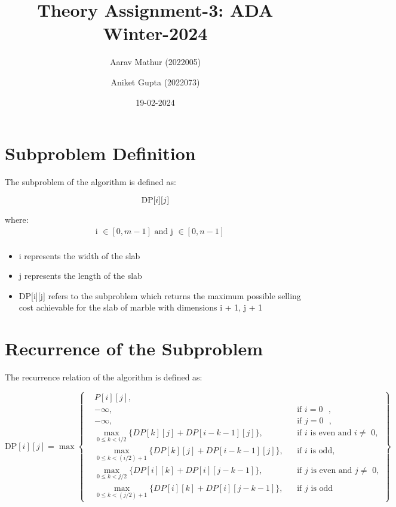 \documentclass{article}
\title{Theory Assignment-3: ADA Winter-2024}
\author{Aarav Mathur (2022005) \and Aniket Gupta (2022073)}
\date{19-02-2024}
\begin{document}
\maketitle

\section{Subproblem Definition}

The subproblem of the algorithm is defined as:

\[
\text{{DP}}\text[i][j]
\]

where:
\begin{align*}
& \text{ i $\in [0,m-1]$ and j $\in [0,n-1]$}  \\
\end{align*}

\begin{itemize}
    \item i represents the width of the slab
    \item j represents the length of the slab
    \item DP[i][j] refers to the subproblem which returns the maximum possible selling cost achievable for the slab of marble with dimensions i + 1, j + 1
\end{itemize}

\section{Recurrence of the Subproblem}

The recurrence relation of the algorithm is defined as:

\[
\text{DP}[i][j] = \max \left\{
\begin{aligned}
&P[i][j], \\
&-{\infty}, && \text{if } i = 0 \text{ }, \\
&-{\infty}, && \text{if } j = 0 \text{ }, \\
&\max_{0 \leq k < i/2} \{DP[k][j] + DP[i-k-1][j]\}, && \text{if } i \text{ is even and $i\neq$ 0}, \\
&\max_{0 \leq k < (i/2) + 1} \{DP[k][j] + DP[i-k-1][j]\}, && \text{if } i \text{ is odd}, \\
&\max_{0 \leq k < j/2} \{DP[i][k] + DP[i][j-k-1]\}, && \text{if } j \text{ is even and $j\neq$ 0}, \\
&\max_{0 \leq k < (j/2) + 1} \{DP[i][k] + DP[i][j-k-1]\}, && \text{if } j \text{ is odd}
\end{aligned}
\right\}
\]
\end{document}
